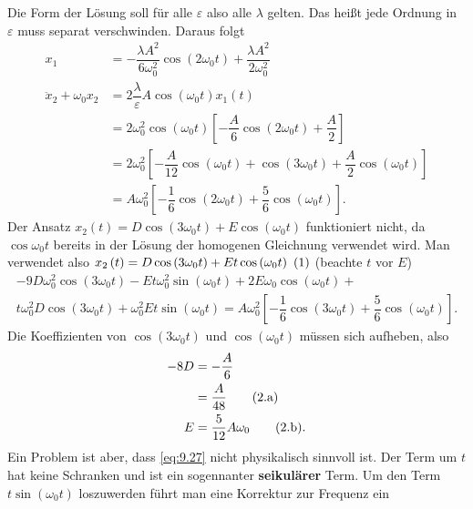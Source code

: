 \documentclass[a4paper,12pt]{article}
\newcommand\inlineeqno{\stepcounter{equation}\ {(\theequation)}}
\newcommand\inlineeqnowoa{\theequation.\text{a}}
\newcommand\inlineeqnowob{\theequation.\text{b}}
\numberwithin{equation}{section}
\begin{document}
Die Form der Lösung soll für alle $\varepsilon $ also alle $\lambda $ gelten. Das heißt jede Ordnung in $\varepsilon $ muss separat verschwinden. Daraus folgt
\begin{align} 
        x_1&=-\dfrac{\lambda A^2}{6\omega _0^2}\cos \left(2\omega _0t\right)+\dfrac{\lambda A^2}{2\omega _0^2}\nonumber \\
        \ddot{x}_2+\omega _0x_2&=2\dfrac{\lambda }{\varepsilon }A\cos \left(\omega _0t\right)x_1\left(t\right)\nonumber \\
                               &=2\omega _0^2\cos \left(\omega _0t\right)\left[-\dfrac{A}{6}\cos \left(2\omega _0t\right)+\dfrac{A}{2}\right]\nonumber \\
                               &=2\omega _0^2\left[-\dfrac{A}{12}\cos \left(\omega _0t\right)+\cos \left(3\omega _0t\right)+\dfrac{A}{2}\cos \left(\omega _0t\right)\right]\nonumber \\
                               &=A\omega _0^2\left[-\dfrac{1}{6}\cos \left(2\omega _0t\right)+\dfrac{5}{6}\cos \left(\omega _0t\right)\right]\label{eq:9.26}
.\end{align} 
Der Ansatz $x_2\left(t\right)=D\cos \left(3\omega _0t\right)+E\cos \left(\omega _0t\right)$ funktioniert nicht, da $\cos \omega _0t$ bereits in der Lösung der homogenen Gleichnung verwendet wird. Man verwendet also $x_2\left(t\right)=D\cos \left(3\omega _0t\right)+Et\cos \left(\omega _0t\right)\inlineeqno\label{eq:9.27}$ (beachte $t$ vor $E$)
\begin{multline*}
        -9D\omega _0^2\cos \left(3\omega _0t\right)-Et\omega _0^2\sin \left(\omega _0t\right)+2E\omega _0\cos \left(\omega _0t\right)+\\t\omega _0^2D\cos \left(3\omega _0t\right)+\omega _0^2Et\sin \left(\omega _0t\right)=A\omega _0^2\left[-\dfrac{1}{6}\cos \left(3\omega _0t\right)+\dfrac{5}{6}\cos \left(\omega _0t\right)\right]
.\end{multline*}
Die Koeffizienten von $\cos \left(3\omega _0t\right)$ und $\cos \left(\omega _0t\right)$ müssen sich aufheben, also
\begin{align*} 
        -8D&=-\dfrac{A}{6}\\
           &=\dfrac{A}{48}\stepcounter{equation}\tag{\inlineeqnowoa}\label{eq:9.28.a}\\
        E&=\dfrac{5}{12}A\omega _0\tag{\inlineeqnowob}\label{eq:9.28.b}
.\end{align*} 
Ein Problem ist aber, dass \eqref{eq:9.27} nicht physikalisch sinnvoll ist. Der Term um $t$ hat keine Schranken und ist ein sogennanter \textbf{seikulärer} Term. Um den Term $t\sin \left(\omega _0t\right)$ loszuwerden führt man eine Korrektur zur Frequenz ein
\end{document}
